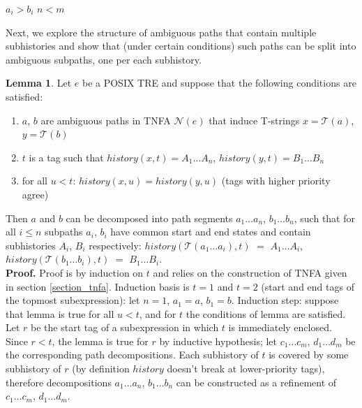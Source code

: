 \documentclass{article}
\newcommand{\Xeq}{\!=\!}
\newcommand{\XN}{\mathcal{N}}
\newcommand{\XT}{\mathcal{T}}
\theoremstyle{definition}
\newtheorem{XLem}{Lemma}
\begin{document}
\begin{multicols}{2}
    \begin{algorithm}[H] \DontPrintSemicolon {} 
     {
        \For {$i \Xeq \overline{1, min(n, m)}$} {
             {\Return $a_i \!>\! b_i$}
        }
        \Return $n \!<\! m$ \;
    }
    \end{algorithm}

Next, we explore the structure of ambiguous paths that contain multiple subhistories
and show that (under certain conditions) such paths can be split into ambiguous subpaths,
one per each subhistory.

\begin{XLem}\label{lemma_path_decomposition}
Let $e$ be a POSIX TRE and suppose that the following conditions are satisfied:
\begin{enumerate}
    \item $a$, $b$ are ambiguous paths in TNFA $\XN(e)$ that induce T-strings $x \Xeq \XT(a)$, $y \Xeq \XT(b)$
    \item $t$ is a tag such that $history(x, t) \Xeq A_1 \dots A_n$, $history(y, t) \Xeq B_1 \dots B_n$
    \item for all $u \!<\! t$: $history(x, u) \Xeq history(y, u)$
        (tags with higher priority agree)
\end{enumerate}
Then $a$ and $b$ can be decomposed into path segments $a_1 \dots a_n$, $b_1 \dots b_n$,
such that for all $i \!\leq\! n$ subpaths $a_i$, $b_i$ have common start and end states and
contain subhistories $A_i$, $B_i$ respectively:
$history(\XT(a_1 \dots a_i), t)$ $\Xeq$ $A_1 \dots A_i$,
$history(\XT(b_1 \dots b_i), t)$ $\Xeq$ $B_1 \dots B_i$.
\\[0.5em]
\textbf{Proof.}
Proof is by induction on $t$ and relies on the construction of TNFA given in section \ref{section_tnfa}.
Induction basis is $t \Xeq 1$ and $t \Xeq 2$ (start and end tags of the topmost subexpression): let $n \Xeq 1$, $a_1 \Xeq a$, $b_1 \Xeq b$.
Induction step: suppose that lemma is true for all $u \!<\! t$,
and for $t$ the conditions of lemma are satisfied.
Let $r$ be the start tag of a subexpression in which $t$ is immediately enclosed.
Since $r \!<\! t$, the lemma is true for $r$ by inductive hypothesis;
let $c_1 \dots c_m$, $d_1 \dots d_m$ be the corresponding path decompositions.
Each subhistory of $t$ is covered by some subhistory of $r$ (by definition $history$ doesn't break at lower-priority tags),
therefore decompositions $a_1 \dots a_n$, $b_1 \dots b_n$ can be constructed as a refinement of $c_1 \dots c_m$, $d_1 \dots d_m$.

\end{XLem}
\end{multicols}
\end{document}
